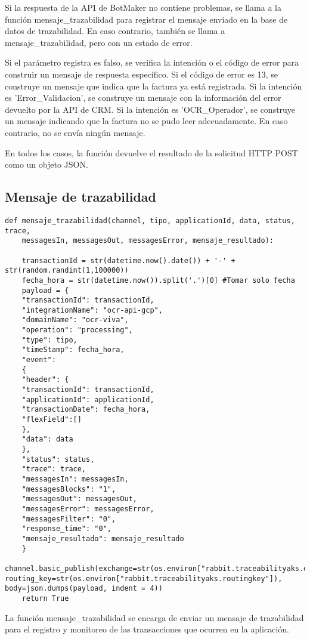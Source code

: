 \documentclass{article}
\begin{document}
Si la respuesta de la API de BotMaker no contiene problemas, se llama a la función mensaje\_trazabilidad para registrar el mensaje enviado en la base de datos de trazabilidad. En caso contrario, también se llama a mensaje\_trazabilidad, pero con un estado de error.

Si el parámetro registra es falso, se verifica la intención o el código de error para construir un mensaje de respuesta específico. Si el código de error es 13, se construye un mensaje que indica que la factura ya está registrada. Si la intención es 'Error\_Validacion', se construye un mensaje con la información del error devuelto por la API de CRM. Si la intención es 'OCR\_Operador', se construye un mensaje indicando que la factura no se pudo leer adecuadamente. En caso contrario, no se envía ningún mensaje.

En todos los casos, la función devuelve el resultado de la solicitud HTTP POST como un objeto JSON.

\subsection{Mensaje de trazabilidad}
\begin{lstlisting}
def mensaje_trazabilidad(channel, tipo, applicationId, data, status, trace,
    messagesIn, messagesOut, messagesError, mensaje_resultado):

    transactionId = str(datetime.now().date()) + '-' + str(random.randint(1,100000))
    fecha_hora = str(datetime.now()).split('.')[0] #Tomar solo fecha
    payload = {
    "transactionId": transactionId,
    "integrationName": "ocr-api-gcp",
    "domainName": "ocr-viva",
    "operation": "processing",
    "type": tipo,
    "timeStamp": fecha_hora,
    "event":
    {
    "header": {
    "transactionId": transactionId,
    "applicationId": applicationId,
    "transactionDate": fecha_hora,
    "flexField":[]
    },
    "data": data
    },
    "status": status,
    "trace": trace,
    "messagesIn": messagesIn,
    "messagesBlocks": "1",
    "messagesOut": messagesOut,
    "messagesError": messagesError,
    "messagesFilter": "0",
    "response_time": "0",
    "mensaje_resultado": mensaje_resultado
    }
    channel.basic_publish(exchange=str(os.environ["rabbit.traceabilityaks.exchange"]), routing_key=str(os.environ["rabbit.traceabilityaks.routingkey"]), body=json.dumps(payload, indent = 4))
    return True
\end{lstlisting}
La función mensaje\_trazabilidad se encarga de enviar un mensaje de trazabilidad para el registro y monitoreo de las transacciones que ocurren en la aplicación.
\end{document}
